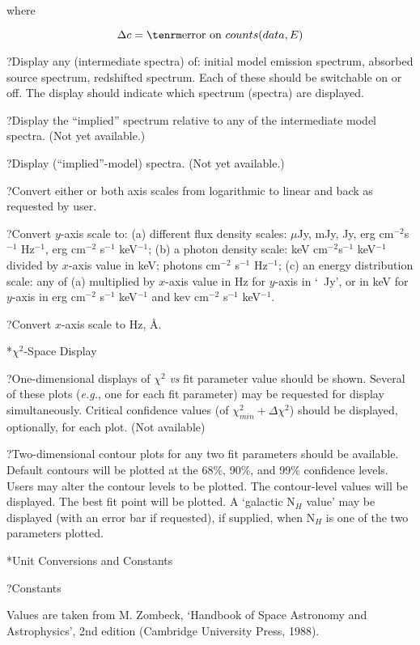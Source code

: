 \itemitem{}where

$$\Delta c = {\rm error~on}~counts(data, E)$$

\??Display any (intermediate spectra) of:  initial model emission
spectrum, absorbed source spectrum,
redshifted spectrum.  Each of these should be switchable
on or off.  The display should indicate which spectrum (spectra) are displayed.

\??Display the ``implied'' spectrum relative to any of the
intermediate model spectra. (Not yet available.)

\??Display (``implied''-model) spectra. (Not yet available.)

\??Convert either or both axis scales from logarithmic to linear and back as
requested by user.

\??Convert $y$-axis scale to: (a) different flux density scales: $\mu$Jy, mJy,
Jy, erg cm$^{-2}$s$^{-1}$ Hz$^{-1}$, erg cm$^{-2}$ s$^{-1}$ keV$^{-1}$;
(b) a photon density scale: keV cm$^{-2}$s$^{-1}$ keV$^{-1}$ divided by $x$-axis
value in keV; photons cm$^{-2}$ s$^{-1}$ Hz$^{-1}$; (c) an energy
distribution scale:  any of (a) multiplied by $x$-axis value in Hz for 
$y$-axis in `~Jy', or in keV for
$y$-axis in erg cm$^{-2}$ s$^{-1}$ keV$^{-1}$ and kev cm$^{-2}$ s$^{-1}$ keV$^{-1}$.

\??Convert $x$-axis scale to Hz, \AA.

\**$\chi^{2}$-Space Display

\??One-dimensional displays of $\chi^{2}$ {\it vs} fit parameter value
should be shown.  Several of these plots ({\it e.g.}, one for each fit parameter)
may be requested for display simultaneously.  Critical confidence values
(of $\chi^{2}_{min}+\Delta\chi^{2}$) should be displayed, optionally, for each
plot. (Not available)

\??Two-dimensional contour plots for any two fit parameters should be
available.  Default contours will be plotted at the 68$\%$, 90$\%$, and 99$\%$
confidence levels.
Users may alter the contour levels to be plotted.  The contour-level
values will be displayed.  The best fit point will be plotted.  A `galactic N$_{H}$
value' may be displayed (with an error bar if requested), if supplied, when
N$_{H}$ is one of the two parameters plotted.

\**Unit Conversions and Constants

\??Constants

{\listlist

Values are taken from M. Zombeck, `Handbook of Space Astronomy and Astrophysics', 2nd
edition (Cambridge University Press, 1988).

}

